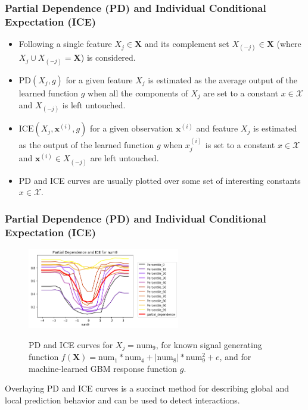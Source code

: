 \documentclass[11pt,
               aspectratio=169
               ]{beamer}
\begin{document}
		\begin{frame}
		
			\frametitle{Partial Dependence (PD) and Individual Conditional Expectation (ICE)}
			
				\vspace{-10 pt}
			
				\begin{itemize}
					
					\item Following \cite{esl} a single feature $X_j \in \mathbf{X}$ and its complement set $X_{(-j)} \in \mathbf{X}$ (where $X_j \cup X_{(-j)} = \mathbf{X}$) is considered.
					
					\item $\text{PD}(X_j, g)$ for a given feature $X_j$ is estimated as the average output of the learned function $g$ when all the components of $X_j$ are set to a constant $x \in \mathcal{X}$ and $X_{(-j)}$ is left untouched.
					
					\item $\text{ICE}(X_j, \mathbf{x}^{(i)}, g)$ for a given observation $\mathbf{x}^{(i)}$ and feature $X_j$ is estimated as the output of the learned function $g$ when $x^{(i)}_j$ is set to a constant $x \in \mathcal{X}$ and $\mathbf{x}^{(i)} \in X_{(-j)}$ are left untouched.
					
					\item PD and ICE curves are usually plotted over some set of interesting constants $x \in \mathcal{X}$. 
				
				\end{itemize}
			
		\end{frame}
	
		\begin{frame}[t]
		
			\frametitle{Partial Dependence (PD) and Individual Conditional Expectation (ICE)}
		
			\begin{figure}[htb]
				\begin{center}
					\includegraphics[height=100pt]{img/pdp_ice.png}
					\label{fig:pdp_ice}
					\caption{PD and ICE curves for $ X_j = \text{num}_9$, for known signal generating function $f(\mathbf{X}) = \text{num} _1 * \text{num}_4 + |\text{num}_8| * \text{num}_9^2 + e$, and for machine-learned GBM response function $g$.}
				\end{center}
			\end{figure}
			
			\vspace{-10pt}
			
			Overlaying PD and ICE curves is a succinct method for describing global and local prediction behavior and can be used to detect interactions. \cite{ice_plots} 
			
		\end{frame}
	
\end{document}
